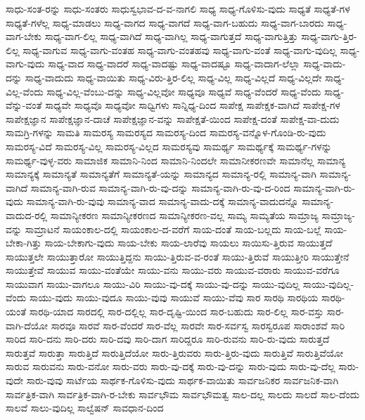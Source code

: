 {ಸಾಧು-ಸಂತ-ರನ್ನು
ಸಾಧು-ಸಂತರು
ಸಾಧುಸ್ವಭಾವ-ದ-ವ-ನಾಗಲಿ
ಸಾಧ್ಯ
ಸಾಧ್ಯ-ಗೊಳಿಸು-ವುದು
ಸಾಧ್ಯತೆ
ಸಾಧ್ಯತೆ-ಗಳ
ಸಾಧ್ಯತೆ-ಗಳೆಲ್ಲ
ಸಾಧ್ಯ-ಮಾಡಲು
ಸಾಧ್ಯ-ವಾಗದ
ಸಾಧ್ಯ-ವಾಗದೆ
ಸಾಧ್ಯ-ವಾಗ-ಬಹುದು
ಸಾಧ್ಯ-ವಾಗ-ಬಾರದು
ಸಾಧ್ಯ-ವಾಗ-ಬೇಕು
ಸಾಧ್ಯ-ವಾಗ-ಲಿಲ್ಲ
ಸಾಧ್ಯ-ವಾಗಿದೆ
ಸಾಧ್ಯ-ವಾಗಿಲ್ಲ
ಸಾಧ್ಯ-ವಾಗುತ್ತದೆ
ಸಾಧ್ಯ-ವಾಗುತ್ತಿತ್ತು
ಸಾಧ್ಯ-ವಾಗು-ತ್ತಿರ-ಲಿಲ್ಲ
ಸಾಧ್ಯ-ವಾಗುವ
ಸಾಧ್ಯ-ವಾಗು-ವಂತಹ
ಸಾಧ್ಯ-ವಾಗು-ವಂತಹವು
ಸಾಧ್ಯ-ವಾಗು-ವಂತೆ
ಸಾಧ್ಯ-ವಾಗು-ವುದಿಲ್ಲ
ಸಾಧ್ಯ-ವಾಗು-ವುದು
ಸಾಧ್ಯ-ವಾದ
ಸಾಧ್ಯ-ವಾದರೆ
ಸಾಧ್ಯ-ವಾದಷ್ಟು
ಸಾಧ್ಯ-ವಾದಷ್ಟೂ
ಸಾಧ್ಯ-ವಾದಾಗ-ಲೆಲ್ಲಾ
ಸಾಧ್ಯ-ವಾದು-ದನ್ನು
ಸಾಧ್ಯ-ವಾದುದು
ಸಾಧ್ಯ-ವಾಯಿತು
ಸಾಧ್ಯ-ವಿರು-ತ್ತಿರ-ಲಿಲ್ಲ
ಸಾಧ್ಯ-ವಿಲ್ಲ
ಸಾಧ್ಯ-ವಿಲ್ಲದೆ
ಸಾಧ್ಯ-ವಿಲ್ಲದೇ
ಸಾಧ್ಯ-ವಿಲ್ಲ-ವೆಂದು
ಸಾಧ್ಯ-ವಿಲ್ಲ-ವೆಂಬು-ದನ್ನು
ಸಾಧ್ಯ-ವಿಲ್ಲವೋ
ಸಾಧ್ಯವೂ
ಸಾಧ್ಯವೆ
ಸಾಧ್ಯ-ವೆಂದರೆ
ಸಾಧ್ಯ-ವೆಂದು
ಸಾಧ್ಯ-ವೆನ್ನು-ವಂತೆ
ಸಾಧ್ಯವೇ
ಸಾಧ್ಯವೊ
ಸಾಧ್ಯವೋ
ಸಾಧ್ವಿಗಳು
ಸಾನ್ನಿಧ್ಯ-ದಿಂದ
ಸಾಪೇಕ್ಷ
ಸಾಪೇಕ್ಷಕ-ವಾಗಿದೆ
ಸಾಪೇಕ್ಷ-ಗಳ
ಸಾಪೇಕ್ಷಜ್ಞಾನ
ಸಾಪೇಕ್ಷಜ್ಞಾನ-ದಾಚೆ
ಸಾಪೇಕ್ಷಜ್ಞಾನ-ವನ್ನು
ಸಾಪೇಕ್ಷತೆ-ಯಿಂದ
ಸಾಪೇಕ್ಷ-ದಂತೆ
ಸಾಪೇಕ್ಷ-ವಾ-ದುದು
ಸಾಮಗ್ರಿ-ಗಳನ್ನು
ಸಾಮತಿ
ಸಾಮರಸ್ಯ
ಸಾಮರಸ್ಯದ
ಸಾಮರಸ್ಯ-ದಿಂದ
ಸಾಮರಸ್ಯ-ವನ್ನೊಳ-ಗೊಂಡಿ-ರು-ವುದು
ಸಾಮರಸ್ಯ-ವಿದೆ
ಸಾಮರಸ್ಯ-ವಿಲ್ಲ
ಸಾಮರಸ್ಯ-ವಿಲ್ಲದ
ಸಾಮರಸ್ಯವು
ಸಾಮರ್ಥ್ಯ
ಸಾಮರ್ಥ್ಯಕ್ಕೆ
ಸಾಮರ್ಥ್ಯ-ಗಳನ್ನು
ಸಾಮರ್ಥ್ಯ-ವುಳ್ಳ-ವರು
ಸಾಮಾಜಿಕ
ಸಾಮಾನಿ-ನಿಂದ
ಸಾಮಾನಿ-ನಿಂದಲೇ
ಸಾಮಾನೀಕರಣವೇ
ಸಾಮಾನೆಲ್ಲ
ಸಾಮಾನ್ಯ
ಸಾಮಾನ್ಯಕ್ಕೆ
ಸಾಮಾನ್ಯತೆ
ಸಾಮಾನ್ಯತೆಗೆ
ಸಾಮಾನ್ಯತೆ-ಯನ್ನು
ಸಾಮಾನ್ಯದ
ಸಾಮಾನ್ಯ-ರಲ್ಲಿ
ಸಾಮಾನ್ಯ-ವಾಗಿ
ಸಾಮಾನ್ಯ-ವಾಗಿದೆ
ಸಾಮಾನ್ಯ-ವಾಗಿ-ರುವ
ಸಾಮಾನ್ಯ-ವಾಗಿ-ರು-ವು-ದನ್ನು
ಸಾಮಾನ್ಯ-ವಾಗಿ-ರು-ವು-ದ-ರಿಂದ
ಸಾಮಾನ್ಯ-ವಾಗಿ-ರು-ವುದು
ಸಾಮಾನ್ಯ-ವಾಗಿ-ರು-ವುವು
ಸಾಮಾನ್ಯ-ವಾದ
ಸಾಮಾನ್ಯ-ವಾದು-ದಕ್ಕೆ
ಸಾಮಾನ್ಯ-ವಾದುದನ್ನೊ
ಸಾಮಾನ್ಯ-ವಾದುದ-ರಲ್ಲಿ
ಸಾಮಾನ್ಯೀಕರಣ
ಸಾಮಾನ್ಯೀಕರಣದ
ಸಾಮಾನ್ಯೀಕರಣ-ವಲ್ಲ
ಸಾಮ್ಯ
ಸಾಮ್ಯತೆಯ
ಸಾಮ್ರಾಜ್ಯ
ಸಾಮ್ರಾಜ್ಯ-ವನ್ನು
ಸಾಮ್ರಾಟನೆ
ಸಾಯಂಕಾಲ-ದಲ್ಲಿ
ಸಾಯಂಕಾಲ-ದ-ವರೆಗೆ
ಸಾಯ-ದಂತೆ
ಸಾಯ-ಬಲ್ಲದು
ಸಾಯ-ಬಲ್ಲೆ
ಸಾಯ-ಬೇಕಾ-ಗಿತ್ತು
ಸಾಯ-ಬೇಕಾಗು-ವುದು
ಸಾಯ-ಬೇಕು
ಸಾಯ-ಲಾರೆವು
ಸಾಯಲು
ಸಾಯಿಸು-ತ್ತಿರುವ
ಸಾಯುತ್ತದೆ
ಸಾಯುತ್ತಲೇ
ಸಾಯುತ್ತಾರೋ
ಸಾಯುತ್ತಿದ್ದನು
ಸಾಯು-ತ್ತಿರುವ-ವ-ರಂತೆ
ಸಾಯು-ತ್ತಿರುವೆ
ಸಾಯುತ್ತೀರಿ
ಸಾಯುತ್ತೇನೆ
ಸಾಯುತ್ತೇವೆ
ಸಾಯುವ
ಸಾಯು-ವಂತೆಯೇ
ಸಾಯು-ವನು
ಸಾಯು-ವರು
ಸಾಯುವ-ವರಾರು
ಸಾಯುವ-ವರೆಗೂ
ಸಾಯುವಾಗ
ಸಾಯು-ವಾಗಲೂ
ಸಾಯು-ವಿರಿ
ಸಾಯು-ವು-ದಕ್ಕೆ
ಸಾಯು-ವು-ದನ್ನು
ಸಾಯು-ವುದಿಲ್ಲ
ಸಾಯು-ವುದಿಲ್ಲ-ವೆಂದು
ಸಾಯು-ವುದು
ಸಾಯು-ವುದೂ
ಸಾಯು-ವುವು
ಸಾಯುವೆ
ಸಾಯು-ವೆವು
ಸಾರ
ಸಾರಥಿ
ಸಾರಥಿಯ
ಸಾರಥಿ-ಯಂತೆ
ಸಾರಥಿ-ಯಾದ
ಸಾರದಲ್ಲಿ
ಸಾರ-ದಲ್ಲಿಲ್ಲ
ಸಾರ-ದೃಷ್ಟಿ-ಯಿಂದ
ಸಾರ-ಬಹುದು
ಸಾರ-ಲಿಲ್ಲ
ಸಾರ-ವಸ್ತು
ಸಾರ-ವಾಗಿ-ದೆಯೋ
ಸಾರವೂ
ಸಾರವೆ
ಸಾರ-ವೆಂದರೆ
ಸಾರ-ವೆಲ್ಲ
ಸಾರವೇ
ಸಾರ-ಸರ್ವಸ್ವ
ಸಾರಸ್ವರೂಪ
ಸಾರಾಂಶವೆ
ಸಾರಿ
ಸಾರಿದ
ಸಾರಿ-ದನು
ಸಾರಿ-ದರು
ಸಾರಿ-ದವು
ಸಾರಿ-ದಾಗ
ಸಾರಿದ್ದರೂ
ಸಾರಿ-ರುವನು
ಸಾರಿ-ರು-ವುದು
ಸಾರುತ್ತದೆ
ಸಾರುತ್ತವೆ
ಸಾರುತ್ತಾ
ಸಾರುತ್ತಿದೆ
ಸಾರುತ್ತಿದೆಯೋ
ಸಾರು-ತ್ತಿರುವರು
ಸಾರು-ತ್ತಿರು-ವುದು
ಸಾರುತ್ತಿವೆ
ಸಾರುತ್ತಿವೆಯೋ
ಸಾರುವ
ಸಾರುವನು
ಸಾರು-ವನೋ
ಸಾರು-ವರು
ಸಾರು-ವು-ದಕ್ಕೆ
ಸಾರು-ವು-ದನ್ನು
ಸಾರು-ವುದು
ಸಾರು-ವು-ದೆಲ್ಲ
ಸಾರು-ವುದೇ
ಸಾರು-ವುವು
ಸಾರ್ಟೆಯ
ಸಾರ್ಥಕ-ಗೊಳಿಸು-ವುದು
ಸಾರ್ಥಕ-ವಾಯಿತು
ಸಾರ್ವಜನಿಕರ
ಸಾರ್ವಜನಿಕ-ವಾಗಿ
ಸಾರ್ವತ್ರಿಕ-ವಾಗಿ
ಸಾರ್ವತ್ರಿಕ-ವಾಗಿ-ರ-ಬೇಕು
ಸಾರ್ವಭೌಮ
ಸಾರ್ವಭೌಮತ್ವ
ಸಾಲ-ದಲ್ಲ
ಸಾಲದು
ಸಾಲದೆ
ಸಾಲ-ದೆಂದು
ಸಾಲವೆ
ಸಾಲು-ವುದಿಲ್ಲ
ಸಾಲ್ವೆಷನ್
ಸಾವಧಾನ-ದಿಂದ
}
